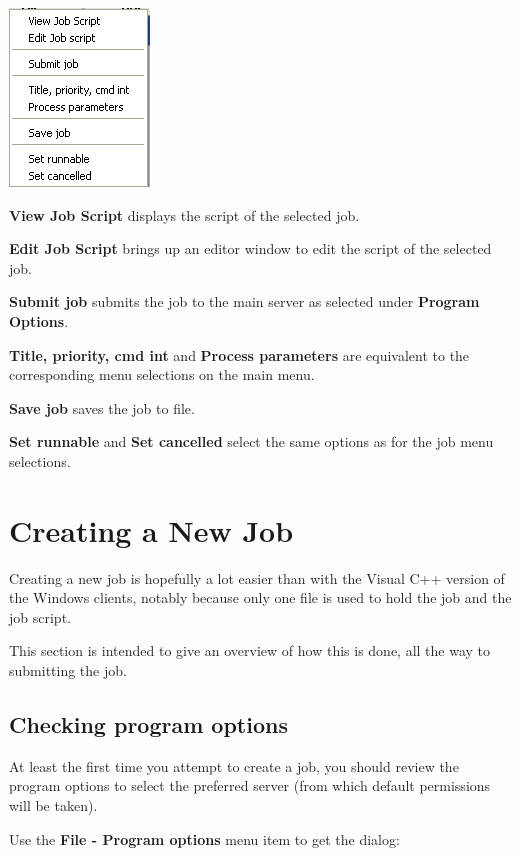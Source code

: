 \includegraphics{img/btrwpopup.png}

\textbf{View Job Script} displays the script of the selected job.

\textbf{Edit Job Script} brings up an editor window to edit the script of the selected job.

\textbf{Submit job} submits the job to the main server as selected under \textbf{Program Options}.

\textbf{Title, priority, cmd int} and \textbf{Process parameters} are equivalent to the corresponding menu selections
on the main menu.

\textbf{Save job} saves the job to file.

\textbf{Set runnable} and \textbf{Set cancelled} select the same options as for the job menu selections.

\section{Creating a New Job}
Creating a new job is hopefully a lot easier than with the Visual C++
version of the Windows clients, notably because only one file is used to
hold the job and the job script.

This section is intended to give an overview of how this is done, all the
way to submitting the job.

\subsection{Checking program options}

At least the first time you attempt to create a job, you should review
the program options to select the preferred server (from which default
permissions will be taken).

Use the \textbf{File - Program options} menu item to get the dialog:

